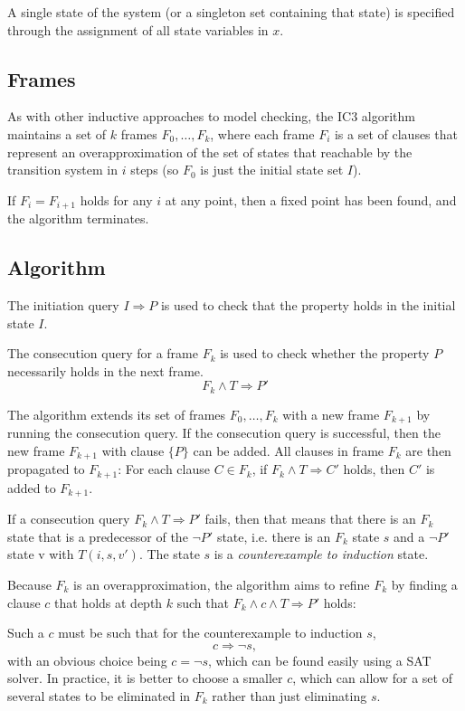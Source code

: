 \documentclass[12pt,a4paper,twoside,openright]{report}
\begin{document}
A single state of the system (or a singleton set containing that state) is specified through the assignment
of all state variables in $x$.

\subsection{Frames}
As with other inductive approaches to model checking,
the IC3 algorithm maintains a set of $k$ frames $F_0,\ldots,F_k$, where
each frame $F_i$ is a set of clauses that represent an overapproximation of the
set of states that reachable by the transition system in $i$ steps
(so $F_0$ is just the initial state set $I$).

If $F_i = F_{i + 1}$ holds for any $i$ at any point, then a fixed point has
been found, and the algorithm terminates.

\subsection{Algorithm}
The initiation query $I \Rightarrow P$ is used to check that the property
holds in the initial state $I$.

The consecution query for a frame $F_k$ is used to check whether the property $P$
necessarily holds in the next frame.
$$F_k \wedge T \Rightarrow P'$$

The algorithm extends its set of frames $F_0,\ldots,F_k$ with a new frame $F_{k + 1}$
by running the consecution query.
If the consecution query is successful, then the new frame $F_{k + 1}$ with clause
$\{P\}$ can be added.
All clauses in frame $F_k$ are then propagated to $F_{k + 1}$:
For each clause $C \in F_k$, if $F_k \wedge T \Rightarrow C'$ holds, then $C'$
is added to $F_{k + 1}$.

If a consecution query $F_k \wedge T \Rightarrow P'$ fails, then that means that
there is an $F_k$ state that is a predecessor of the $\neg P'$ state,
i.e. there is an $F_k$ state $s$ and a $\neg P'$ state v with $T(i,s,v')$. The state
$s$ is a \emph{counterexample to induction} state.

Because $F_k$ is an overapproximation, the algorithm aims to refine $F_k$
by finding a clause $c$ that holds at depth $k$ such that
$F_k \wedge c \wedge T \Rightarrow P'$ holds:

Such a $c$ must be such that for the counterexample to induction $s$,
$$c \Rightarrow \neg s,$$
with an obvious choice being $c = \neg s$, which can be found easily using
a SAT solver. In practice, it is better to choose a smaller $c$, which can allow
for a set of several states to be eliminated in $F_k$ rather than just eliminating
$s$.
\end{document}
